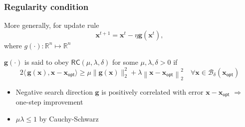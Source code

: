 \documentclass[compress,
mathserif,wide,%
]{beamer}
\begin{document}
\begin{frame}


\frametitle{Regularity condition}
More generally, for update rule
\[
\bm{x}^{t+1} = \bm{x}^t - \eta \bm{g}(\bm{x}^t),
\]
where $g(\cdot) : \mathbb{R}^{n} \mapsto \mathbb{R}^{n}$

\vfill
\begin{definition}
\label{def:reg-condition}
 $\bm{g}(\cdot)$ is said to obey $\mathsf{RC}( \mu,\lambda, \delta )$ for some $ \mu,\lambda, \delta >0 $ if 
\[
2 \langle\, \bm{g}(\bm{x}), \bm{x}-   \bm{x}_{\mathsf{opt}} \rangle\geq {\mu}\| \bm{g}(\bm{x})\|^2_2 + \lambda \left\| \bm{x}-   \bm{x}_{\mathsf{opt}} \right\|_2^2 \quad \forall \bm{x} \in \mathcal{B}_{\delta}(\bm{x}_{\mathsf{opt}})
\]
\end{definition}

\begin{itemize}
	\item Negative search direction $\bm{g}$ is positively correlated with error $\bm{x}-   \bm{x}_{\mathsf{opt}}$ $\Longrightarrow$ one-step improvement
	\item $\mu \lambda \leq 1$ by Cauchy-Schwarz
\end{itemize}
\end{frame}
\end{document}
